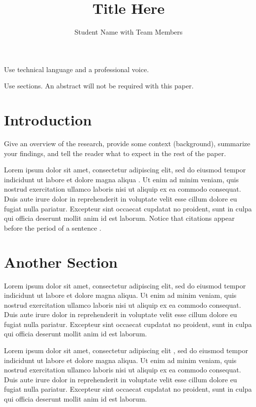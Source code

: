 \documentclass[10pt, twocolumn]{article}
\title{\vspace{-2.0cm} Title Here}
\author{Student Name with Team Members}
\begin{document}
\maketitle

Use technical language and a professional voice.

Use sections. An abstract will not be required with this paper.

\section{Introduction}

Give an overview of the research, provide some context (background), summarize your findings, and tell the reader what to expect in the rest of the paper.

Lorem ipsum dolor sit amet, consectetur adipiscing elit, sed do eiusmod tempor indicidunt ut labore et dolore magna aliqua \cite{smith}. Ut enim ad minim veniam, quis nostrud exercitation ullamco laboris nisi ut aliquip ex ea commodo consequat. Duis aute irure dolor in reprehenderit in voluptate velit esse cillum dolore eu fugiat nulla pariatur. Excepteur sint occaecat cupdatat no proident, sunt in culpa qui officia deserunt mollit anim id est laborum. Notice that citations appear before the period of a sentence \cite{ye}.


\section{Another Section}

Lorem ipsum dolor sit amet, consectetur adipiscing elit, sed do eiusmod tempor indicidunt ut labore et dolore magna aliqua. Ut enim ad minim veniam, quis nostrud exercitation ullamco laboris nisi ut aliquip ex ea commodo consequat. Duis aute irure dolor in reprehenderit in voluptate velit esse cillum dolore eu fugiat nulla pariatur. Excepteur sint occaecat cupdatat no proident, sunt in culpa qui officia deserunt mollit anim id est laborum.

Lorem ipsum dolor sit amet, consectetur adipiscing elit \cite{overleaf}, sed do eiusmod tempor indicidunt ut labore et dolore magna aliqua. Ut enim ad minim veniam, quis nostrud exercitation ullamco laboris nisi ut aliquip ex ea commodo consequat. Duis aute irure dolor in reprehenderit in voluptate velit esse cillum dolore eu fugiat nulla pariatur. Excepteur sint occaecat cupdatat no proident, sunt in culpa qui officia deserunt mollit anim id est laborum.
\end{document}
